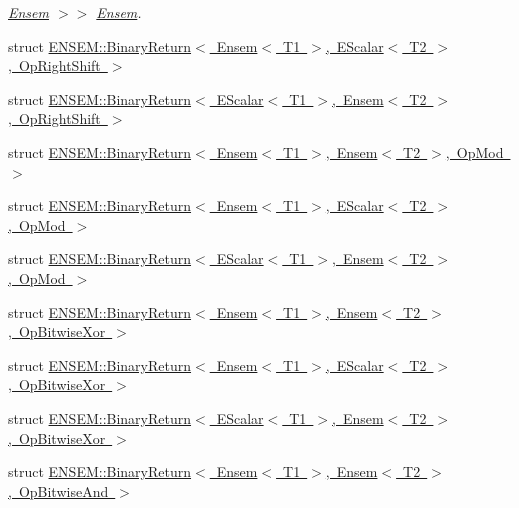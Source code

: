 \begin{DoxyCompactItemize}
\begin{DoxyCompactList}\small\item\em \mbox{\hyperlink{classENSEM_1_1Ensem}{Ensem}} $>$$>$ \mbox{\hyperlink{classENSEM_1_1Ensem}{Ensem}}. \end{DoxyCompactList}\item 
struct \mbox{\hyperlink{structENSEM_1_1BinaryReturn_3_01Ensem_3_01T1_01_4_00_01EScalar_3_01T2_01_4_00_01OpRightShift_01_4}{E\+N\+S\+E\+M\+::\+Binary\+Return$<$ Ensem$<$ T1 $>$, E\+Scalar$<$ T2 $>$, Op\+Right\+Shift $>$}}
\item 
struct \mbox{\hyperlink{structENSEM_1_1BinaryReturn_3_01EScalar_3_01T1_01_4_00_01Ensem_3_01T2_01_4_00_01OpRightShift_01_4}{E\+N\+S\+E\+M\+::\+Binary\+Return$<$ E\+Scalar$<$ T1 $>$, Ensem$<$ T2 $>$, Op\+Right\+Shift $>$}}
\item 
struct \mbox{\hyperlink{structENSEM_1_1BinaryReturn_3_01Ensem_3_01T1_01_4_00_01Ensem_3_01T2_01_4_00_01OpMod_01_4}{E\+N\+S\+E\+M\+::\+Binary\+Return$<$ Ensem$<$ T1 $>$, Ensem$<$ T2 $>$, Op\+Mod $>$}}
\item 
struct \mbox{\hyperlink{structENSEM_1_1BinaryReturn_3_01Ensem_3_01T1_01_4_00_01EScalar_3_01T2_01_4_00_01OpMod_01_4}{E\+N\+S\+E\+M\+::\+Binary\+Return$<$ Ensem$<$ T1 $>$, E\+Scalar$<$ T2 $>$, Op\+Mod $>$}}
\item 
struct \mbox{\hyperlink{structENSEM_1_1BinaryReturn_3_01EScalar_3_01T1_01_4_00_01Ensem_3_01T2_01_4_00_01OpMod_01_4}{E\+N\+S\+E\+M\+::\+Binary\+Return$<$ E\+Scalar$<$ T1 $>$, Ensem$<$ T2 $>$, Op\+Mod $>$}}
\item 
struct \mbox{\hyperlink{structENSEM_1_1BinaryReturn_3_01Ensem_3_01T1_01_4_00_01Ensem_3_01T2_01_4_00_01OpBitwiseXor_01_4}{E\+N\+S\+E\+M\+::\+Binary\+Return$<$ Ensem$<$ T1 $>$, Ensem$<$ T2 $>$, Op\+Bitwise\+Xor $>$}}
\item 
struct \mbox{\hyperlink{structENSEM_1_1BinaryReturn_3_01Ensem_3_01T1_01_4_00_01EScalar_3_01T2_01_4_00_01OpBitwiseXor_01_4}{E\+N\+S\+E\+M\+::\+Binary\+Return$<$ Ensem$<$ T1 $>$, E\+Scalar$<$ T2 $>$, Op\+Bitwise\+Xor $>$}}
\item 
struct \mbox{\hyperlink{structENSEM_1_1BinaryReturn_3_01EScalar_3_01T1_01_4_00_01Ensem_3_01T2_01_4_00_01OpBitwiseXor_01_4}{E\+N\+S\+E\+M\+::\+Binary\+Return$<$ E\+Scalar$<$ T1 $>$, Ensem$<$ T2 $>$, Op\+Bitwise\+Xor $>$}}
\item 
struct \mbox{\hyperlink{structENSEM_1_1BinaryReturn_3_01Ensem_3_01T1_01_4_00_01Ensem_3_01T2_01_4_00_01OpBitwiseAnd_01_4}{E\+N\+S\+E\+M\+::\+Binary\+Return$<$ Ensem$<$ T1 $>$, Ensem$<$ T2 $>$, Op\+Bitwise\+And $>$}}

\end{DoxyCompactItemize}
